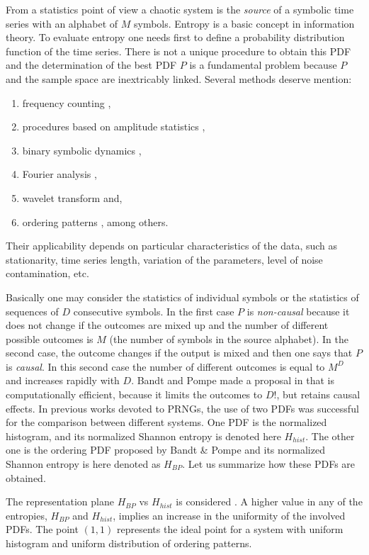 From a statistics point of view a chaotic system is the \textsl{source} of a symbolic time series with an alphabet of $M$ symbols. Entropy is a basic concept in information theory. To evaluate entropy  one needs first to define a probability distribution function of the time series. There is not a unique procedure to obtain this PDF and the determination of the best PDF $P$ is a fundamental problem because $P$ and the sample space are inextricably linked.
Several methods deserve mention: 
\begin{enumerate}
\item frequency counting \cite{Rosso2009}, 
\item procedures based on amplitude statistics \cite{DeMicco2008}, 
\item binary symbolic dynamics \cite{Mischaikow1999}, 
\item Fourier analysis \cite{Powell1979}, 
\item wavelet transform \cite{Rosso2001} and,
\item ordering patterns \cite{Pompe2002}, among others.  
\end{enumerate}
Their applicability depends on particular characteristics of the data, such as stationarity, time series length, variation of the parameters, level of noise contamination, etc.

Basically one may consider the statistics of individual symbols or the statistics of sequences of $D$ consecutive symbols. In the first case  $P$ is \emph{non-causal} because it does not change if the outcomes are mixed up and the number of different possible outcomes is $M$ (the number of symbols in the source alphabet). In the second case, the outcome changes if the output is mixed and then one says that $P$ is \emph{causal}. In this second case the number of different outcomes is equal to $M^D$ and increases rapidly with $D$. Bandt and Pompe made a proposal in \cite{Pompe2002} that is computationally efficient, because it limits the outcomes to $D!$, but retains causal effects. In previous works devoted to PRNGs, the use of two
PDFs was successful for the comparison between different systems. One PDF is the
normalized histogram, and its normalized Shannon
entropy is denoted here $H_{hist}$. The other one is the ordering PDF
proposed by Bandt \& Pompe \cite{Pompe2002} and its  normalized Shannon entropy is  here denoted as $H_{BP}$. Let us summarize how these
PDFs are obtained.

The representation plane $H_{BP}$ vs $H_{hist}$ is considered \cite{DeMicco2008}.
A higher value in any of the entropies, $H_{BP}$ and $H_{hist}$, implies an
increase in the uniformity of the involved PDFs. The point
$(1,1)$ represents the ideal point for a system with uniform histogram and
uniform distribution of ordering patterns.
